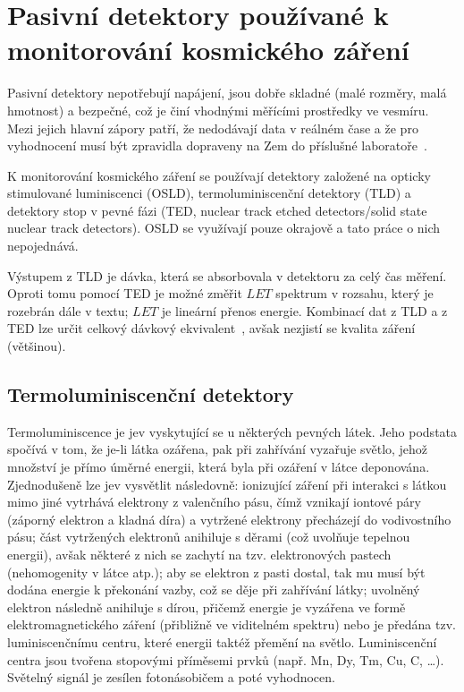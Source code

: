 \chapter{Pasivní detektory používané k monitorování kosmického záření}\label{sec:detektory_detektory}
Pasivní detektory nepotřebují napájení, jsou dobře skladné (malé rozměry, malá hmotnost) a bezpečné, což je činí vhodnými měřícími prostředky ve vesmíru. Mezi jejich hlavní zápory patří, že nedodávají data v reálném čase a že pro vyhodnocení musí být zpravidla dopraveny na Zem do příslušné laboratoře~\cite{benton}.

K monitorování kosmického záření se používají detektory založené na opticky stimulované luminiscenci (OSLD), termoluminiscenční detektory (TLD) a detektory stop v pevné fázi (TED, nuclear track etched detectors/solid state nuclear track detectors). OSLD se využívají pouze okrajově a tato práce o nich nepojednává.

Výstupem z TLD je dávka, která se absorbovala v detektoru za celý čas měření. Oproti tomu pomocí TED je možné změřit $\mathit{LET}$ spektrum v rozsahu, který je rozebrán dále v textu; $\mathit{LET}$ je lineární přenos energie. Kombinací dat z TLD a z TED lze určit celkový dávkový ekvivalent~\cite{benton}, avšak nezjistí se kvalita záření (většinou).
\section{Termoluminiscenční detektory}\label{sec:detektory_TLD}
Termoluminiscence je jev vyskytující se u některých pevných látek. Jeho podstata spočívá v tom, že je-li látka ozářena, pak při zahřívání vyzařuje světlo, jehož množství je přímo úměrné energii, která byla při ozáření v látce deponována. Zjednodušeně lze jev vysvětlit následovně: ionizující záření při interakci s látkou mimo jiné vytrhává elektrony z valenčního pásu, čímž vznikají iontové páry (záporný elektron a kladná díra) a vytržené elektrony přecházejí do vodivostního pásu; část vytržených elektronů anihiluje s děrami (což uvolňuje tepelnou energii), avšak některé z nich se zachytí na tzv. elektronových pastech (nehomogenity v látce atp.); aby se elektron z pasti dostal, tak mu musí být dodána energie k překonání vazby, což se děje při zahřívání látky; uvolněný elektron následně
anihiluje s dírou, přičemž energie je vyzářena ve formě elektromagnetického záření (přibližně ve viditelném spektru) nebo je předána tzv. luminiscenčnímu centru, které energii taktéž přemění na světlo. Luminiscenční centra jsou tvořena stopovými příměsemi prvků (např. Mn, Dy, Tm, Cu, C, \ldots). Světelný signál je zesílen fotonásobičem a poté vyhodnocen.

